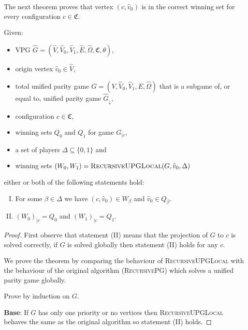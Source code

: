 The next theorem proves that vertex $(c,\hat{v}_0)$ is in the correct winning set for every configuration $c \in \mathfrak{C}$.
\begin{theorem}
	Given:
	\begin{itemize}
		\item VPG $\hat{G} = (\hat{V}, \hat{V}_0,\hat{V}_1,\hat{E},\hat{\Omega},\mathfrak{C},\theta)$,
		\item origin vertex $\hat{v}_0 \in \hat{V}$,
		\item total unified parity game $G = (V, \hat{V}_0, \hat{V}_1,E,\hat{\Omega})$ that is a subgame of, or equal to, unified parity game $\hat{G}_{\downarrow}$,
		\item configuration $c\in \mathfrak{C}$,
		\item winning sets $Q_0$ and $Q_1$ for game $G_{|c}$,
		\item a set of players $\Delta \subseteq \{0,1\}$ and
		\item winning sets $(W_0, W_1) = \textsc{RecursiveUPGLocal}(G,\hat{v}_0,\Delta)$
	\end{itemize}
either or both of the following statements hold:
	\begin{enumerate}[(I)]
		\item For some $\beta \in \Delta$ we have $(c,\hat{v}_0) \in W_\beta$ and $\hat{v}_0 \in Q_\beta$.
		\item $(W_0)_{|c} = Q_0$ and $(W_1)_{|c} = Q_1$.
	\end{enumerate}
\begin{proof}
	First observe that statement (II) means that the projection of $G$ to $c$ is solved correctly, if $G$ is solved globally then statement (II) holds for any $c$.
	
	We prove the theorem by comparing the behaviour of \textsc{RecursiveUPGLocal} with the behaviour of the original algorithm (\textsc{RecursivePG}) which solves a unified parity game globally.
	
	Prove by induction on $G$.
	
	\textbf{Base}: If $G$ has only one priority or no vertices then \textsc{RecursiveUPGLocal} behaves the same as the original algorithm so statement (II) holds.


\end{proof}
\end{theorem}
